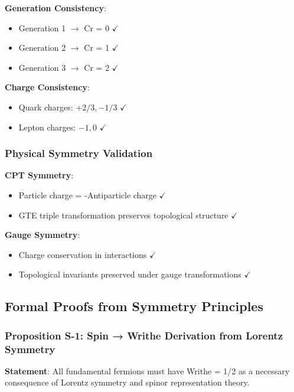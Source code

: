 \documentclass[11pt]{article}
\theoremstyle{remark}
\begin{document}
\textbf{Generation Consistency}:
\begin{itemize}
    \item Generation 1 $\rightarrow$ Cr = 0 $\checkmark$
    \item Generation 2 $\rightarrow$ Cr = 1 $\checkmark$
    \item Generation 3 $\rightarrow$ Cr = 2 $\checkmark$
\end{itemize}

\textbf{Charge Consistency}:
\begin{itemize}
    \item Quark charges: $+2/3, -1/3$ $\checkmark$
    \item Lepton charges: $-1, 0$ $\checkmark$
\end{itemize}

\subsubsection{Physical Symmetry Validation}

\textbf{CPT Symmetry}: 
\begin{itemize}
    \item Particle charge = -Antiparticle charge $\checkmark$
    \item GTE triple transformation preserves topological structure $\checkmark$
\end{itemize}

\textbf{Gauge Symmetry}:
\begin{itemize}
    \item Charge conservation in interactions $\checkmark$
    \item Topological invariants preserved under gauge transformations $\checkmark$
\end{itemize}


\subsection{Formal Proofs from Symmetry Principles}

\subsubsection{Proposition S-1: Spin → Writhe Derivation from Lorentz Symmetry}

\textbf{Statement}: All fundamental fermions must have Writhe = 1/2 as a necessary consequence of Lorentz symmetry and spinor representation theory.
\end{document}
